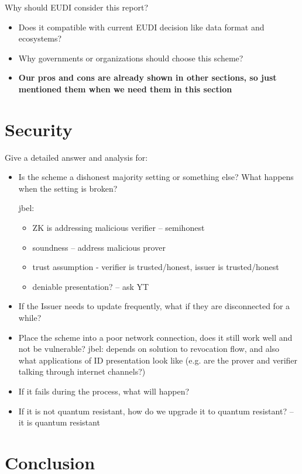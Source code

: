 \documentclass{iacrtrans}
\newcommand{\jbel}[1]{{\color{blue}{}jbel: #1}}
\begin{document}
Why should EUDI consider this report?
\begin{itemize}
    \item Does it compatible with current EUDI decision like data format and ecosystems?
    \item Why governments or organizations should choose this scheme?
    \item \textbf{Our pros and cons are already shown in other sections, so just mentioned them when we need them in this section}
\end{itemize}

\section{Security}
\label{sec:security}

Give a detailed answer and analysis for:
\begin{itemize}
    \item Is the scheme a dishonest majority setting or something else? What happens when the setting is broken?
    \jbel{\begin{itemize}
        \item ZK is addressing malicious verifier -- semihonest 
        \item soundness -- address malicious prover
        \item trust assumption - verifier is trusted/honest, issuer is trusted/honest
        \item deniable presentation? -- ask YT
    \end{itemize}}
        
    \item If the Issuer needs to update frequently, what if they are disconnected for a while? 
    \item Place the scheme into a poor network connection, does it still work well and not be vulnerable?
    \jbel{depends on solution to revocation flow, and also what applications of ID presentation look like (e.g. are the prover and verifier talking through internet channels?)}
	\item If it fails during the process, what will happen?
	\item If it is not quantum resistant, how do we upgrade it to quantum resistant? -- it is quantum resistant
\end{itemize}


\section{Conclusion}
\label{sec:conclusion}



\end{document}

